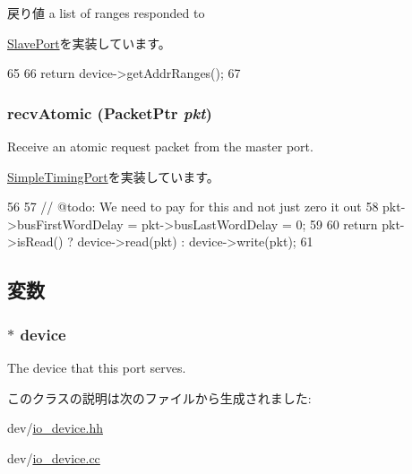 \begin{DoxyReturn}{戻り値}
a list of ranges responded to 
\end{DoxyReturn}


\hyperlink{classSlavePort_a6e967f8921e80748eb2be35b6b481a7e}{SlavePort}を実装しています。


\begin{DoxyCode}
65 {
66     return device->getAddrRanges();
67 }
\end{DoxyCode}
\hypertarget{classPioPort_a5f0b4c4a94f6b0053f9d7a4eb9c2518a}{
\subsubsection[{recvAtomic}]{ recvAtomic ({\bf PacketPtr} {\em pkt})}}
\label{classPioPort_a5f0b4c4a94f6b0053f9d7a4eb9c2518a}
Receive an atomic request packet from the master port. 

\hyperlink{classSimpleTimingPort_a428ab07671bc9372dc44a2487b12a726}{SimpleTimingPort}を実装しています。


\begin{DoxyCode}
56 {
57     // @todo: We need to pay for this and not just zero it out
58     pkt->busFirstWordDelay = pkt->busLastWordDelay = 0;
59 
60     return pkt->isRead() ? device->read(pkt) : device->write(pkt);
61 }
\end{DoxyCode}


\subsection{変数}
\hypertarget{classPioPort_a3560f59726d0dbf34b5993ee6c685143}{
\subsubsection[{device}]{$\ast$ {\bf device}}}
\label{classPioPort_a3560f59726d0dbf34b5993ee6c685143}
The device that this port serves. 

このクラスの説明は次のファイルから生成されました:\begin{DoxyCompactItemize}
\item 
dev/\hyperlink{io__device_8hh}{io\_\-device.hh}\item 
dev/\hyperlink{io__device_8cc}{io\_\-device.cc}\end{DoxyCompactItemize}
